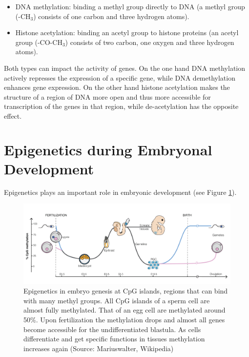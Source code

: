 \documentclass[
  11pt,
]{book}
\providecommand{\tightlist}{%
  \setlength{\itemsep}{0pt}\setlength{\parskip}{0pt}}
\begin{document}
\begin{itemize}
\tightlist
\item
  DNA methylation: binding a methyl group directly to DNA (a methyl group (-CH\(_3\)) consists of one carbon and three hydrogen atoms).
\item
  Histone acetylation: binding an acetyl group to histone proteins (an acetyl group (-CO-CH\(_3\)) consists of two carbon, one oxygen and three hydrogen atoms).
\end{itemize}

Both types can impact the activity of genes.
On the one hand DNA methylation actively represses the expression of a specific gene, while DNA demethylation enhances gene expression.
On the other hand histone acetylation makes the structure of a region of DNA more open and thus more accessible for transcription of the genes in that region, while de-acetylation has the opposite effect.

\hypertarget{epigenetics-during-embryonal-development}{%
\section{Epigenetics during Embryonal Development}\label{epigenetics-during-embryonal-development}}

Epigenetics plays an important role in embryonic development (see Figure \ref{fig:epiEmbryo}).



\begin{figure}

{\centering \includegraphics[width=1\linewidth]{./figs/DNA_methylation_reprogramming} 

}

\caption{Epigenetics in embryo genesis at CpG islands, regions that can bind with many methyl groups. All CpG islands of a sperm cell are almost fully methylated. That of an egg cell are methylated around 50\%. Upon fertilization the methylation drops and almost all genes become accessible for the undifferentiated blastula. As cells differentiate and get specific functions in tissues methylation increases again (Source: Mariuswalter, Wikipedia)}\label{fig:epiEmbryo}
\end{figure}
\end{document}
